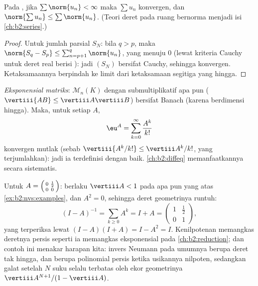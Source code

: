 \begin{theorem}\label{thm:b2:nvs:absoluteconvergence}
Pada , jika $\sum \norm{u_n} < \infty$ maka $\sum u_n$
konvergen, dan $\norm{\sum u_n} \leq \sum\norm{u_n}$. (Teori 
deret pada ruang bernorma menjadi isi \cref{ch:b2:series}.)
\end{theorem}

\begin{proof}
Untuk jumlah parsial $S_N$: bila $q > p$, maka $\norm{S_q - S_p} \leq
\sum_{n=p+1}^{q}\norm{u_n}$, yang menuju $0$ (lewat kriteria Cauchy
untuk deret real berisi ): jadi $(S_N)$ bersifat Cauchy,
sehingga konvergen. Ketaksamaannya berpindah ke limit dari ketaksamaan
segitiga yang hingga.
\end{proof}

\begin{example}\label{ex:b2:nvs:matrixexp}
\emph{Eksponensial matriks}:
$\mathcal{M}_n(K)$ dengan  submultiplikatif apa pun ($\vertiii{AB}
\leq \vertiii A \vertiii B$) bersifat Banach (karena berdimensi hingga).
Maka, untuk setiap $A$,
\[
\eu^A = \sum_{k=0}^{\infty} \frac{A^k}{k!}
\]
konvergen mutlak (sebab $\vertiii{A^k/k!} \leq \vertiii A^k /k!$, yang
terjumlahkan): jadi ia terdefinisi dengan baik. \cref{ch:b2:diffeq}
memanfaatkannya secara sistematis.
\end{example}

\begin{example}\label{ex:b2:nvs:neumannfinite}
Untuk $A = \begin{psmallmatrix}0 & \frac12\\ 0 &
0\end{psmallmatrix}$: berlaku $\vertiii A < 1$ pada  apa
pun yang  atas  \cref{ex:b2:nvs:examples}, dan $A^2 = 0$,
sehingga deret geometrinya runtuh:
\[
(I - A)^{-1} = \sum_{k \geq 0} A^k = I + A =
\begin{pmatrix}1 & \tfrac12\\ 0 & 1\end{pmatrix},
\]
yang terperiksa lewat $(I - A)(I + A) = I - A^2 = I$. Kenilpotenan
memangkas deretnya persis seperti ia memangkas eksponensial pada
\cref{ch:b2:reduction}; dan contoh ini menakar
harapan kita: invers Neumann pada umumnya berupa deret tak hingga,
dan berupa polinomial persis ketika usikannya nilpoten,
sedangkan galat setelah $N$ suku selalu terbatas oleh
ekor geometrinya $\vertiii A^{N+1}/(1 - \vertiii A)$.
\end{example}

